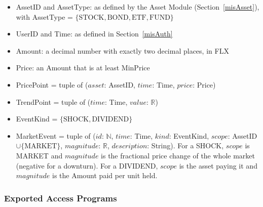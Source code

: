 \documentclass[12pt, titlepage]{article}
\begin{document}
\begin{itemize}
\item AssetID and AssetType: as defined by the Asset Module (Section~\ref{misAsset}),
  with AssetType = $\{\mathrm{STOCK}, \mathrm{BOND}, \mathrm{ETF},
  \mathrm{FUND}\}$
\item UserID and Time: as defined in Section~\ref{misAuth}
\item Amount: a decimal number with exactly two decimal places, in FLX
\item Price: an Amount that is at least \textsf{MinPrice}
\item PricePoint = tuple of ($\mathit{asset}$: AssetID, $\mathit{time}$:
  Time, $\mathit{price}$: Price)
\item TrendPoint = tuple of ($\mathit{time}$: Time, $\mathit{value}$:
  $\mathbb{R}$)
\item EventKind = $\{\mathrm{SHOCK}, \mathrm{DIVIDEND}\}$
\item MarketEvent = tuple of ($\mathit{id}$: $\mathbb{N}$, $\mathit{time}$:
  Time, $\mathit{kind}$: EventKind, $\mathit{scope}$: AssetID $\cup
  \{\mathrm{MARKET}\}$, $\mathit{magnitude}$: $\mathbb{R}$,
  $\mathit{description}$: String). For a SHOCK, $\mathit{scope}$ is MARKET
  and $\mathit{magnitude}$ is the fractional price change of the whole
  market (negative for a downturn). For a DIVIDEND, $\mathit{scope}$ is the
  asset paying it and $\mathit{magnitude}$ is the Amount paid per unit held.
\end{itemize}

\subsubsection{Exported Access Programs}
\end{document}
